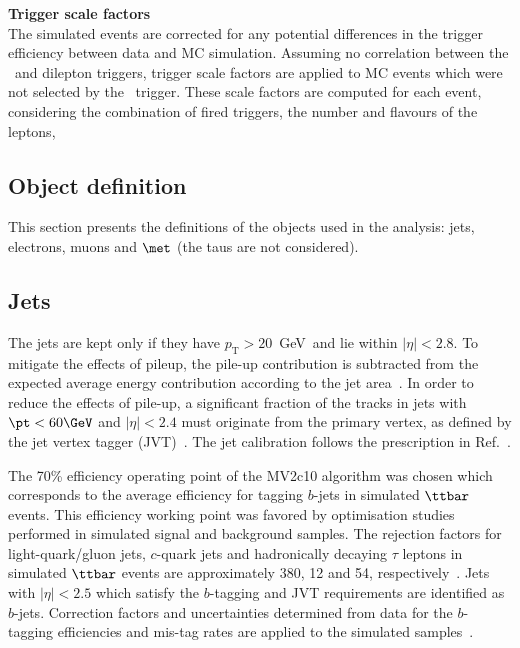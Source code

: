 \par{\bfseries Trigger scale factors\\}
The simulated events are corrected for any potential differences in 
the trigger efficiency between data and MC simulation.
Assuming no correlation between the \met\ and dilepton triggers, 
trigger scale factors are applied to MC events which were not selected 
by the \met\ trigger.
These scale factors are computed for each event, considering the combination of fired triggers, the number and flavours of the leptons, 

\subsection{Object definition}
\label{subsec:strategy.sel.obj}

This section presents the definitions of the objects used in the analysis: 
jets, electrons, muons and $\met$ (the taus are not considered).

\subsection*{Jets}
\label{subsec:sec.strategy.sel.objects_jets}



The jets are kept only if they have $p_\mathrm{T}>20$~GeV~and lie 
within $|\eta|<2.8$. 
To mitigate the effects of pileup, the pile-up contribution is subtracted 
from the expected average energy contribution according to the jet area~\cite{Cacciari:2007fd,Aaboud:2017jcu}.
In order to reduce the effects of pile-up, 
a significant fraction of the tracks in jets with $\pt<60 \GeV$ and $|\eta|<2.4$ must originate from the primary vertex, 
as defined by the jet vertex tagger (JVT)~\cite{ATLAS-CONF-2014-018}. 
The jet calibration follows the prescription in Ref.~\cite{Aaboud:2017jcu}.

 
The 70\% efficiency operating point of the MV2c10 algorithm  was chosen which 
corresponds to the
average efficiency for tagging $b$-jets in simulated $\ttbar$ events. 
This efficiency working point was favored by optimisation studies performed in 
simulated signal and background samples.
The rejection factors for light-quark/gluon jets, $c$-quark jets and hadronically decaying $\tau$ leptons in simulated $\ttbar$ events 
are approximately 380, 12 and 54, respectively~\cite{ATL-PHYS-PUB-2015-022,ATL-PHYS-PUB-2016-012}. 
Jets with $|\eta|<2.5$ which satisfy the $b$-tagging and JVT requirements are identified as $b$-jets. 
Correction factors and uncertainties determined from data for the $b$-tagging efficiencies and mis-tag rates
are applied to the simulated samples~\cite{ATL-PHYS-PUB-2015-022}. 

